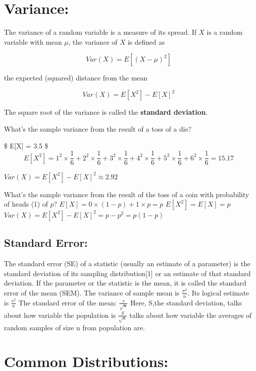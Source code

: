 \documentclass[]{article}
\begin{document}
\hypertarget{variance}{%
\section{Variance:}\label{variance}}

The variance of a random variable is a measure of its spread. If \(X\)
is a random variable with mean \(\mu\), the variance of \(X\) is defined
as

\[Var(X) = E[(X - \mu)^2]\]

the expected (squared) distance from the mean

\[Var(X) = E[X^2] - E[X]^2\]

The square root of the variance is called the \textbf{standard
deviation}.

What's the sample variance from the result of a toss of a die?

\$ E{[}X{]} = 3.5 \$ \[
E[X^2] = 1 ^ 2 \times \frac{1}{6} + 2 ^ 2 \times \frac{1}{6} + 3 ^ 2 \times \frac{1}{6} + 4 ^ 2 \times \frac{1}{6} + 5 ^ 2 \times \frac{1}{6} + 6 ^ 2 \times \frac{1}{6} = 15.17
\]

\(Var(X) = E[X^2] - E[X]^2 \approx 2.92\)

What's the sample variance from the result of the toss of a coin with
probability of heads (1) of \(p\)?
\(E[X] = 0 \times (1 - p) + 1 \times p = p\) \(E[X^2] = E[X] = p\)
\(Var(X) = E[X^2] - E[X]^2 = p - p^2 = p(1 - p)\)

\hypertarget{standard-error}{%
\subsection{Standard Error:}\label{standard-error}}

The standard error (SE) of a statistic (usually an estimate of a
parameter) is the standard deviation of its sampling distribution{[}1{]}
or an estimate of that standard deviation. If the parameter or the
statistic is the mean, it is called the standard error of the mean
(SEM). The variance of sample mean is \(\frac{\sigma^2}{n}\). Its
logical estimate is \(\frac{s^2}{n}\) The standard error of the mean:
\(\frac{s}{\sqrt{n}}\) Here, S,the standard deviation, talks about how
variable the population is \(\frac{S}{\sqrt{n}}\) talks about how
variable the averages of random samples of size n from population are.

\hypertarget{common-distributions}{%
\section{Common Distributions:}\label{common-distributions}}
\end{document}
